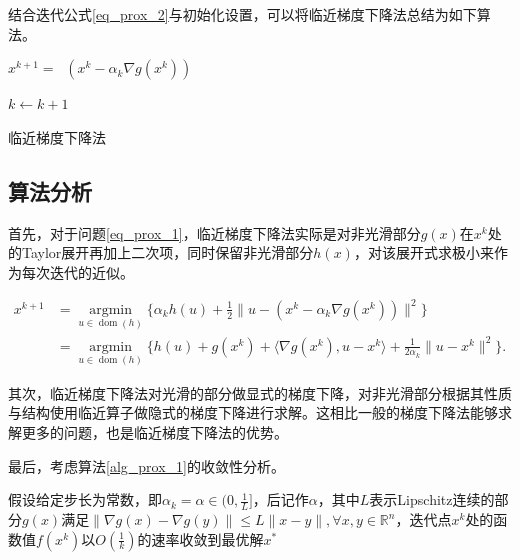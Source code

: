 结合迭代公式\ref{eq_prox_2}与初始化设置，可以将临近梯度下降法总结为如下算法。

\begin{algorithm}\label{alg_prox_1}

    \SetAlgoLined

     {
        $x^{k+1} = \mathop{\mathrm{prox_{\alpha_{k} h}}}(x^{k} - \alpha_{k}\nabla g(x^{k}))$

        $k \leftarrow k+1$
    }
    \caption{临近梯度下降法}
\end{algorithm}

\subsection{算法分析}

首先，对于问题\ref{eq_prox_1}，临近梯度下降法实际是对非光滑部分$g(x)$在$x^{k}$处的Taylor展开再加上二次项，同时保留非光滑部分$h(x)$，对该展开式求极小来作为每次迭代的近似。

\begin{equation}
    \begin{split}
        x^{k+1} &=  \mathop{\mathrm{argmin}}\limits_{u\in \mathop{\mathrm{dom}} (h)}\{\alpha_{k}h(u) + \frac{1}{2}\|u-(x^{k}-\alpha_{k}\nabla g(x^{k}))\|^{2}\} \\
                &= \mathop{\mathrm{argmin}}\limits_{u\in \mathop{\mathrm{dom}} (h)} \{h(u)+g(x^{k})+\langle \nabla g(x^{k}), u-x^{k} \rangle + \frac{1}{2\alpha_{k}}\|u-x^{k}\|^{2}\}.
    \end{split}
\end{equation}

其次，临近梯度下降法对光滑的部分做显式的梯度下降，对非光滑部分根据其性质与结构使用临近算子做隐式的梯度下降进行求解。这相比一般的梯度下降法能够求解更多的问题，也是临近梯度下降法的优势。

最后，考虑算法\ref{alg_prox_1}的收敛性分析。

\begin{theorem}
    假设给定步长为常数，即$\alpha_{k}=\alpha\in (0, \frac{1}{L}]$，后记作$\alpha$，其中$L$表示Lipschitz连续的部分$g(x)$满足$\|\nabla g(x)-\nabla g(y)\| \leq L\|x-y\|, \forall x, y \in \mathbb{R}^{n}$，迭代点$x^{k}$处的函数值$f(x^{k})$以$O(\frac{1}{k})$的速率收敛到最优解$x^{*}$
\end{theorem}

